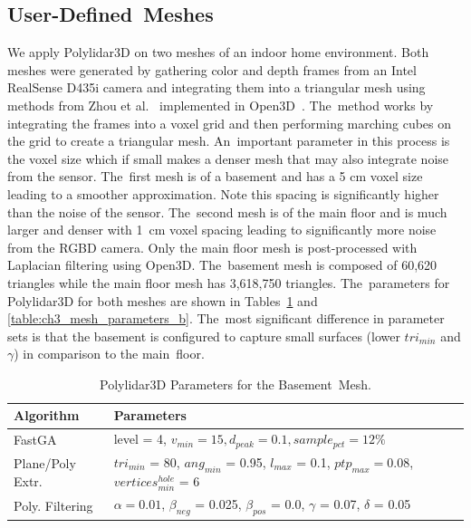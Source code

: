 \subsection{User-Defined~Meshes}\label{sec:ch3_results_meshes_parallel}

We apply Polylidar3D on two meshes of an indoor home environment.  Both meshes were generated by gathering color and depth frames from an Intel RealSense D435i camera and integrating them into a triangular mesh using methods from Zhou et al.~\cite{zhou_dense_2013}  implemented in Open3D~\cite{zhou_open3d_2018}. The~method works by integrating the frames into a voxel grid and then performing marching cubes on the grid to create a triangular mesh. An~important parameter in this process is the voxel size which if small makes a denser mesh that may also integrate noise from the sensor. The~first mesh is of a basement and has a 5 cm voxel size leading to a smoother approximation. Note this spacing is significantly higher than the noise of the sensor. The~second mesh is of the main floor and is much larger and denser with 1~cm voxel spacing leading to significantly more noise from the \ac{RGBD} camera. Only the main floor mesh is post-processed with Laplacian filtering using Open3D. The~basement mesh is composed of 60,620 triangles while the main floor mesh has 3,618,750 triangles. The~parameters for Polylidar3D for both meshes are shown in Tables~\ref{table:ch3_mesh_parameters_a} and \ref{table:ch3_mesh_parameters_b}. The~most significant difference in parameter sets is that the basement is configured to capture small surfaces (lower $tri_{min}$ and $\gamma$) in comparison to the main~floor.

\begin{table}[H]
\centering
\caption{Polylidar3D Parameters for the Basement~Mesh.}\label{table:ch3_mesh_parameters_a}
\begin{tabular}{@{}ll@{}}
\toprule
\textbf{Algorithm}        & \textbf{Parameters}                                                          \\ \midrule
FastGA           & level = 4,  $v_{min} = 15, d_{peak} = 0.1, sample_{pct} = 12\%$            \\
Plane/Poly Extr.      & $tri_{min}$ = 80, $ang_{min}$ = 0.95, $l_{max}$ = 0.1, $ptp_{max} = 0.08$, $vertices^{hole}_{min}$ = 6     \\
Poly. Filtering      & $\alpha = 0.01$, $\beta_{neg}$ = 0.025, $\beta_{pos}$ = 0.0, $\gamma$ = 0.07, $\delta$ = 0.05     \\ \bottomrule
\end{tabular}
\end{table}
\unskip

